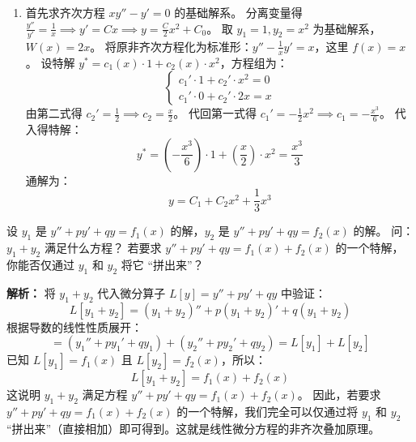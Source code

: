 \documentclass[lang=cn,11pt]{elegantbook}
\begin{document}
\begin{solution}
\begin{enumerate}
\[  \]
  \item[(3)] 首先求齐次方程 $xy'' - y' = 0$ 的基础解系。
  分离变量得 $\frac{y''}{y'} = \frac{1}{x} \implies y' = C x \implies y = \frac{C}{2}x^2 + C_0$。
  取 $y_1 = 1, y_2 = x^2$ 为基础解系，$W(x) = 2x$。
  将原非齐次方程化为标准形：$y'' - \frac{1}{x}y' = x$，这里 $f(x)=x$。
  设特解 $y^* = c_1(x) \cdot 1 + c_2(x) \cdot x^2$，方程组为：
  \[
  \begin{cases}
  c_1' \cdot 1 + c_2' \cdot x^2 = 0 \\
  c_1' \cdot 0 + c_2' \cdot 2x = x
  \end{cases}
  \]
  由第二式得 $c_2' = \frac{1}{2} \implies c_2 = \frac{x}{2}$。
  代回第一式得 $c_1' = -\frac{1}{2}x^2 \implies c_1 = -\frac{x^3}{6}$。
  代入得特解：
  \[
  y^* = \left(-\frac{x^3}{6}\right) \cdot 1 + \left(\frac{x}{2}\right) \cdot x^2 = \frac{x^3}{3}
  \]
  通解为：
  \[
  y = C_1 + C_2 x^2 + \frac{1}{3}x^3
  \]
\end{enumerate}
\end{solution}

\begin{exercise}[提高：叠加原理的应用]
设 $y_1$ 是 $y''+py'+qy=f_1(x)$ 的解，$y_2$ 是 $y''+py'+qy=f_2(x)$ 的解。
问：$y_1+y_2$ 满足什么方程？
若要求 $y''+py'+qy=f_1(x)+f_2(x)$ 的一个特解，
你能否仅通过 $y_1$ 和 $y_2$ 将它 ``拼出来''？
\end{exercise}
\begin{solution}
\textbf{解析：}
将 $y_1 + y_2$ 代入微分算子 $L[y] = y'' + py' + qy$ 中验证：
\[
L[y_1 + y_2] = (y_1 + y_2)'' + p(y_1 + y_2)' + q(y_1 + y_2)
\]
根据导数的线性性质展开：
\[
= (y_1'' + py_1' + qy_1) + (y_2'' + py_2' + qy_2) = L[y_1] + L[y_2]
\]
已知 $L[y_1] = f_1(x)$ 且 $L[y_2] = f_2(x)$，所以：
\[
L[y_1 + y_2] = f_1(x) + f_2(x)
\]
这说明 $y_1 + y_2$ 满足方程 $y''+py'+qy=f_1(x)+f_2(x)$。
因此，若要求 $y''+py'+qy=f_1(x)+f_2(x)$ 的一个特解，我们完全可以仅通过将 $y_1$ 和 $y_2$ “拼出来”（直接相加）即可得到。这就是线性微分方程的非齐次叠加原理。
\end{solution}
\end{document}
